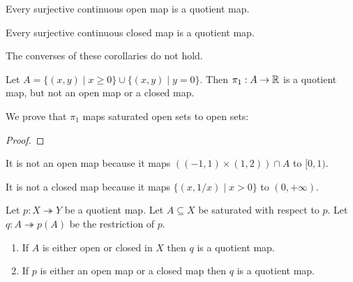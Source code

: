 \begin{corollary}
    \label{corollary:quotient_continuous_open}
    Every surjective continuous open map is a quotient map.
\end{corollary}

\begin{corollary}
    Every surjective continuous closed map is a quotient map.
\end{corollary}

\begin{example}
    The converses of these corollaries do not hold.

    Let $A = \{ (x,y) \mid x \geq 0 \} \cup \{ (x,y) \mid y = 0 \}$. Then $\pi_1 : A \rightarrow \mathbb{R}$ is a quotient map, but not an open map or a closed map.

    We prove that $\pi_1$ maps saturated open sets to open sets:
    \begin{proof}
    \end{proof}

    It is not an open map because it maps $((-1,1) \times (1,2)) \cap A$ to $[0,1)$.

    It is not a closed map because it maps $\{ (x, 1/x) \mid x > 0 \}$ to $(0, +\infty)$.
\end{example}

\begin{proposition}
    \label{proposition:quotient_restriction}
    Let $p : X \twoheadrightarrow Y$ be a quotient map. Let $A \subseteq X$ be saturated with respect to $p$. Let $q : A \twoheadrightarrow p(A)$ be the restriction of $p$.
    \begin{enumerate}
        \item If $A$ is either open or closed in $X$ then $q$ is a quotient map.
        \item If $p$ is either an open map or a closed map then $q$ is a quotient map.
    \end{enumerate}
\end{proposition}

